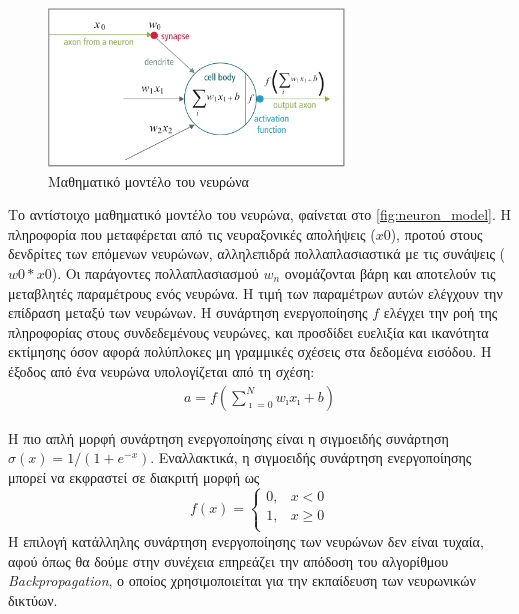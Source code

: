 \begin{figure}[!ht]
  \centering
  \includegraphics[width=0.7\textwidth]{./images/chapter3/neuron_model.jpg}
  \caption[Μαθηματικό μοντέλο του νευρώνα]{Μαθηματικό μοντέλο του νευρώνα}
  \label{fig:neuron_model}
\end{figure}

Το αντίστοιχο μαθηματικό μοντέλο του νευρώνα, φαίνεται στο \autoref{fig:neuron_model}.
Η πληροφορία που μεταφέρεται από τις νευραξονικές απολήψεις ($x0$), προτού
στους δενδρίτες των επόμενων νευρώνων, αλληλεπιδρά πολλαπλασιαστικά με τις
συνάψεις ($w0*x0$). Οι παράγοντες πολλαπλασιασμού $w_n$ ονομάζονται βάρη
και αποτελούν τις μεταβλητές παραμέτρους ενός νευρώνα. Η τιμή των παραμέτρων
αυτών ελέγχουν την επίδραση μεταξύ των νευρώνων. Η συνάρτηση ενεργοποίησης $f$
ελέγχει την ροή της πληροφορίας στους συνδεδεμένους νευρώνες,
και προσδίδει ευελιξία και ικανότητα εκτίμησης όσον αφορά πολύπλοκες μη γραμμικές
σχέσεις στα δεδομένα εισόδου. Η έξοδος από ένα νευρώνα υπολογίζεται από τη σχέση:
\begin{gather*}
  a = f(\sum_{\imath=0}^{N}w_{\imath}x_{\imath} + b)
\end{gather*}

Η πιο απλή μορφή συνάρτηση ενεργοποίησης
είναι η σιγμοειδής συνάρτηση $\sigma(x) = 1 / (1 + e^{-x})$.
Εναλλακτικά, η σιγμοειδής συνάρτηση ενεργοποίησης μπορεί να εκφραστεί σε διακριτή μορφή ως
\[
f(x) =
  \begin{cases}
    0, & x < 0 \\
    1, & x \geq 0 \\
  \end{cases}
\]
Η επιλογή κατάλληλης συνάρτηση ενεργοποίησης των
νευρώνων δεν είναι τυχαία, αφού όπως θα δούμε στην
συνέχεια επηρεάζει την απόδοση του αλγορίθμου \emph{Backpropagation}, ο οποίος
χρησιμοποιείται για την εκπαίδευση των νευρωνικών δικτύων.


